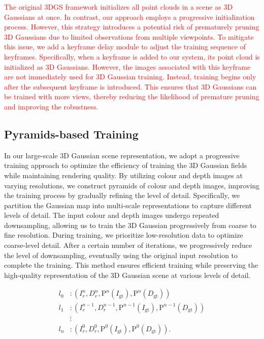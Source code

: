 \documentclass[lettersize,journal]{IEEEtran}
\begin{document}
\textcolor{red}{The original 3DGS framework\cite{kerbl20233d} initializes all point clouds in a scene as 3D Gaussians at once. In contrast, our approach employs a progressive initialization process. However, this strategy introduces a potential risk of prematurely pruning 3D Gaussians due to limited observations from multiple viewpoints. To mitigate this issue, we add a keyframe delay module to adjust the training sequence of keyframes. Specifically, when a keyframe is added to our system, its point cloud is initialized as 3D Gaussians. However, the images associated with this keyframe are not immediately used for 3D Gaussian training. Instead, training begins only after the subsequent keyframe is introduced. This ensures that 3D Gaussians can be trained with more views, thereby reducing the likelihood of premature pruning and improving the robustness.}


\subsection{Pyramids-based Training}
In our large-scale 3D Gaussian scene representation, we adopt a progressive training approach to optimize the efficiency of training the 3D Gaussian fields while maintaining rendering quality. By utilizing colour and depth images at varying resolutions, we construct pyramids of colour and depth images, improving the training process by gradually refining the level of detail. Specifically, we partition the Gaussian map into multi-scale representations to capture different levels of detail. The input colour and depth images undergo repeated downsampling, allowing us to train the 3D Gaussian progressively from coarse to fine resolution. During training, we prioritize low-resolution data to optimize coarse-level detail. After a certain number of iterations, we progressively reduce the level of downsampling, eventually using the original input resolution to complete the training. This method ensures efficient training while preserving the high-quality representation of the 3D Gaussian scene at various levels of detail.

\begin{equation}
\begin{aligned}
l_0 & :  \left( I_r^n, D_r^n , \mathrm{P}^n (I_\text{gt}), \mathrm{P}^n (D_\text{gt}) \right) \\
l_1 & : \left( I_r^{n-1}, D_r^{n-1}, \mathrm{P}^{n-1} (I_\text{gt}),\mathrm{P}^{n-1} (D_\text{gt}) \right) \\
& \vdots \\
l_n & : \left( I_r^0, D_r^0,  \mathrm{P}^0 (I_\text{gt}), \mathrm{P}^0 (D_\text{gt}) \right).
\end{aligned}
\end{equation}
\end{document}
